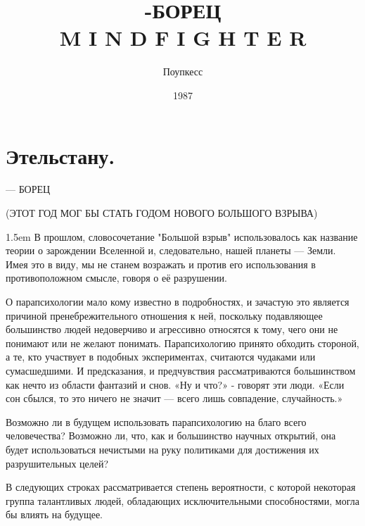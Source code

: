 \documentclass[a4paper,12pt]{book}
\begin{document}
\title{\textbf{-БОРЕЦ\\
    \normalsize M I N D F I G H T E R}\vspace{40pt}}
\author{ Поупкесс\vspace{320pt}}
\date{\Large1987}

\maketitle
\tableofcontents

\chapter*{ Этельстану.}
\newpage
\begin{center}
 — БОРЕЦ\\
\end{center}
\par
\noindent(ЭТОТ ГОД МОГ БЫ СТАТЬ ГОДОМ НОВОГО БОЛЬШОГО ВЗРЫВА)\\
\par
\emergencystretch 1.5em
\hfuzz 0.3pt
В прошлом, словосочетание "Большой взрыв" использовалось как название теории о зарождении Вселенной и, следовательно, нашей планеты — Земли. Имея это в виду, мы не станем возражать и против его использования в противоположном смысле, говоря о её разрушении.\\
\par
О парапсихологии мало кому известно в подробностях, и зачастую это является причиной пренебрежительного отношения к ней, поскольку подавляющее большинство людей недоверчиво и агрессивно относятся к тому, чего они не понимают или не желают понимать. Парапсихологию принято обходить стороной, а те, кто участвует в подобных экспериментах, считаются чудаками или сумасшедшими. И предсказания, и предчувствия рассматриваются большинством как нечто из области фантазий и снов. «Ну и что?» - говорят эти люди. «Если сон сбылся, то это ничего не значит — всего лишь совпадение, случайность.»\\
\par
Возможно ли в будущем использовать парапсихологию на благо всего человечества? Возможно ли, что, как и большинство научных открытий, она будет использоваться нечистыми на руку политиками для достижения их разрушительных целей?\\
\par
В следующих строках рассматривается степень вероятности, с которой некоторая группа талантливых людей, обладающих исключительными способностями, могла бы влиять на будущее.\\
\end{document}
